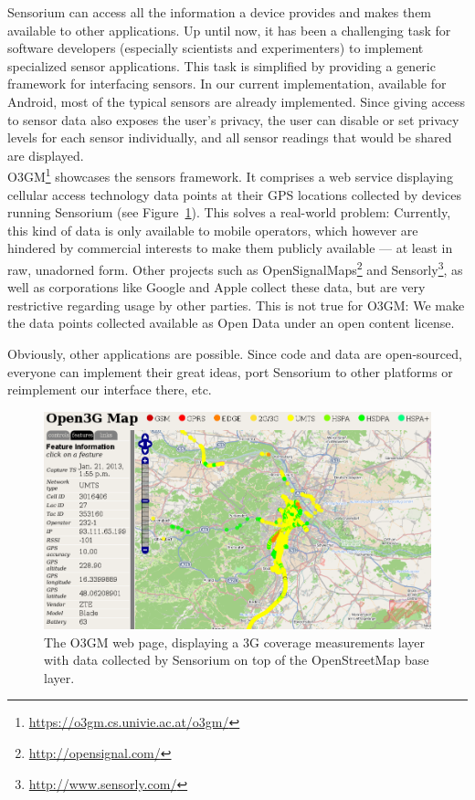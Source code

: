 Sensorium can access all the information a device provides and makes them available to other applications. Up until now, it has been a challenging task for software developers (especially scientists and experimenters) to implement specialized sensor applications. This task is simplified by providing a generic framework for interfacing sensors. In our current implementation, available for Android, most of the typical sensors are already implemented. Since giving access to sensor data also exposes the user's privacy, the user can disable or set privacy levels for each sensor individually, and all sensor readings that would be shared are displayed. %
\\

\gls{O3GM}\footnote{\url{https://o3gm.cs.univie.ac.at/o3gm/}} showcases the sensors framework. It comprises a web service displaying cellular access technology data points at their \gls{GPS} locations collected by devices running Sensorium (see Figure~\ref{c5:fig:ogggm}). This solves a real-world problem: Currently, this kind of data is only available to mobile operators, which however  are hindered by commercial interests to make them publicly available --- at least in raw, unadorned form. Other projects such as OpenSignalMaps\footnote{\url{http://opensignal.com/}} and Sensorly\footnote{\url{http://www.sensorly.com/}}, as well as corporations like Google and Apple collect these data, but are very restrictive regarding usage by other parties. This is not true for \gls{O3GM}: We make the data points collected available as Open Data under an open content license.

Obviously, other applications are possible. Since code and data are open-sourced, everyone can implement their great ideas, port Sensorium to other platforms or reimplement our interface there, etc.

\begin{figure}[htb]
\centering
\includegraphics[width=\textwidth]{images/o3gm.png}
\caption{The \gls{O3GM} web page, displaying a \gls{3G} coverage measurements layer with data collected by Sensorium on top of the OpenStreetMap base layer.}
\label{c5:fig:ogggm}
\end{figure}


